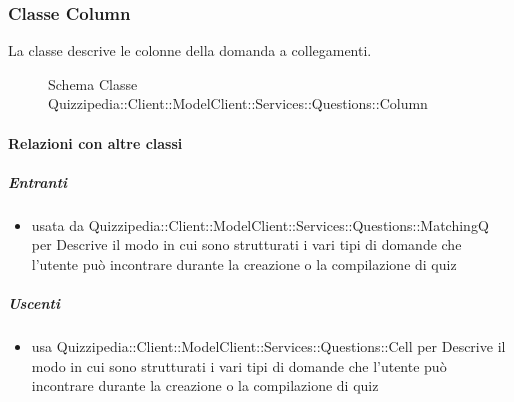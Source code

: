 \subsubsection{Classe Column}
La classe descrive le colonne della domanda a collegamenti.
\begin{figure}[H]
\centering
\noindent{}
\caption[Schema Classe Column]{Schema Classe Quizzipedia::Client::ModelClient::Services::Questions::Column}
\end{figure}
\paragraph{Relazioni con altre classi}
\subparagraph{Entranti}
\begin{itemize}
\item usata da Quizzipedia::Client::ModelClient::Services::Questions::MatchingQ per Descrive il modo in cui sono strutturati i vari tipi di domande che l'utente può incontrare durante la creazione o la compilazione di quiz
\end{itemize}
\subparagraph{Uscenti}
\begin{itemize}
\item usa Quizzipedia::Client::ModelClient::Services::Questions::Cell per Descrive il modo in cui sono strutturati i vari tipi di domande che l'utente può incontrare durante la creazione o la compilazione di quiz
\end{itemize}
